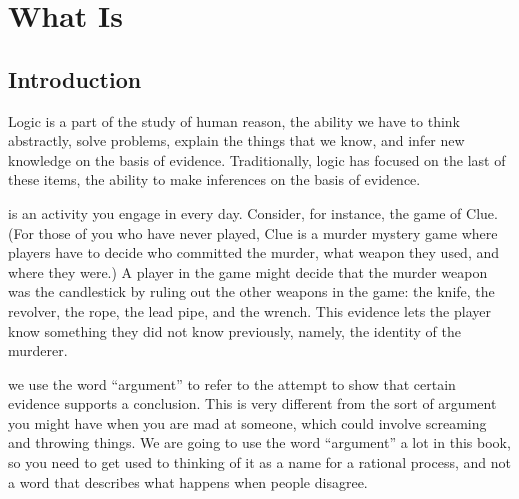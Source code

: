 \chapter{What Is }
\label{Chap:what_is_logic}

\label{noexplanation}


\section{Introduction}

 Logic is a part of the study of human reason, the ability we have to think abstractly, solve problems, explain the things that we know, and infer new knowledge on the basis of evidence. Traditionally, logic has focused on the last of these items, the ability to make inferences on the basis of evidence. 

 is an activity you engage in every day. Consider, for instance, the game of Clue. (For those of you who have never played, Clue is a murder mystery game where players have to decide who committed the murder, what weapon they used, and where they were.) A player in the game might decide that the murder weapon was the candlestick by ruling out the other weapons in the game: the knife, the revolver, the rope, the lead pipe, and the wrench. This evidence lets the player know something they did not know previously, namely, the identity of the murderer.

 we use the word ``argument'' to refer to the attempt to show that certain evidence supports a conclusion. This is very different from the sort of argument you might have when you are mad at someone, which could involve screaming and throwing things. We are going to use the word ``argument'' a lot in this book, so you need to get used to thinking of it as a name for a rational process, and not a word that describes what happens when people disagree.

